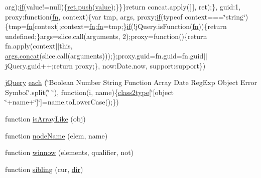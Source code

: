 \begin{DoxyCompactItemize}
arg);\hyperlink{jquery-3_82_81_8js_ad6cbdd9e1fadb4d9540fff933cdd6fdc}{if}(value!=null)\{\hyperlink{jquery-3_82_81_8js_aa24e781fe0b662d38aac138432ec5e48}{ret.\+push}(\hyperlink{jquery-3_82_81_8js_a9d32b6baf31ab8047d93bf7e388971b9}{value});\}\}\}return concat.\+apply(\mbox{[}$\,$\mbox{]}, ret);\}, guid\+:1, proxy\+:function(\hyperlink{jquery-3_82_81_8js_acef6bdaf6b9b20fdcca1ea86f0902c3b}{fn}, context)\{var tmp, args, proxy;\hyperlink{jquery-3_82_81_8js_ad6cbdd9e1fadb4d9540fff933cdd6fdc}{if}(typeof context===\char`\"{}string\char`\"{})\{tmp=\hyperlink{jquery-3_82_81_8js_acef6bdaf6b9b20fdcca1ea86f0902c3b}{fn}\mbox{[}context\mbox{]};context=\hyperlink{jquery-3_82_81_8js_acef6bdaf6b9b20fdcca1ea86f0902c3b}{fn};\hyperlink{jquery-3_82_81_8js_acef6bdaf6b9b20fdcca1ea86f0902c3b}{fn}=tmp;\}\hyperlink{jquery-3_82_81_8js_ad6cbdd9e1fadb4d9540fff933cdd6fdc}{if}(!j\+Query.\+is\+Function(\hyperlink{jquery-3_82_81_8js_acef6bdaf6b9b20fdcca1ea86f0902c3b}{fn}))\{return undefined;\}args=slice.\+call(arguments, 2);proxy=function()\{return fn.\+apply(context$\vert$$\vert$this, \hyperlink{jquery-3_82_81_8js_a15269536d89ee10703f1699529a34bdc}{args.\+concat}(slice.\+call(arguments)));\};proxy.\+guid=fn.\+guid=fn.\+guid$\vert$$\vert$j\+Query.\+guid++;return proxy;\}, now\+:\+Date.\+now, support\+:support\})
\item 
\hyperlink{jquery-3_82_81_8js_a609525712f1102566c2b03866ceb2bba}{j\+Query} \hyperlink{jquery-3_82_81_8js_a6d7d6d0a955c4faaf5be7c802162c90a}{each} (\char`\"{}Boolean Number String Function Array Date Reg\+Exp Object Error Symbol\char`\"{}.split(\char`\"{} \char`\"{}), function(i, name)\{\hyperlink{jquery-3_82_81_8js_adef4ad1257810e1309dcf8489dcb4cc5}{class2type}\mbox{[}\char`\"{}\mbox{[}object \char`\"{}+name+\char`\"{}\mbox{]}\char`\"{}\mbox{]}=name.\+to\+Lower\+Case();\})
\item 
function \hyperlink{jquery-3_82_81_8js_a7f7399df462fe5c4e83dd7270da85e76}{is\+Array\+Like} (obj)
\item 
function \hyperlink{jquery-3_82_81_8js_a854062f073039cbb7d73d8119e8c17a4}{node\+Name} (elem, name)
\item 
function \hyperlink{jquery-3_82_81_8js_a9dd6eb2e45ebec05cacf3c8293db6f82}{winnow} (elements, qualifier, not)
\item 
function \hyperlink{jquery-3_82_81_8js_a6382c8dd1f7c57711be638c381a4d0cc}{sibling} (cur, \hyperlink{jquery-3_82_81_8js_a2a297348e1717ffd9ad78297181e31b0}{dir})
\item 
$$
\end{DoxyCompactItemize}
